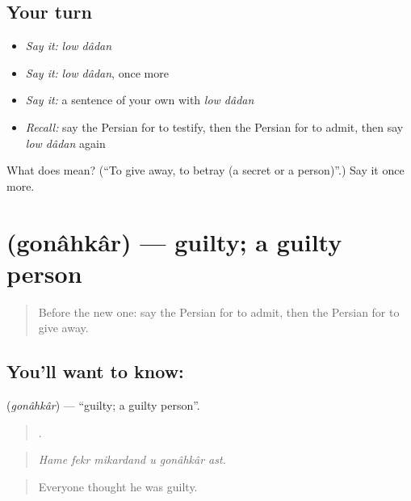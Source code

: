 \subsection*{Your turn}
\begin{itemize}
\raggedright
  \item \emph{Say it:} \emph{low dâdan}
  \item \emph{Say it:} \emph{low dâdan}, once more
  \item \emph{Say it:} a sentence of your own with \emph{low dâdan}
  \item \emph{Recall:} say the Persian for to testify, then the Persian for to admit, then say \emph{low dâdan} again
\end{itemize}

\begin{tcolorbox}[breakable,colback=teal!4,colframe=teal!35!black,title={Before you move on}]
What does   mean? (\textquotedblleft{}To give away, to betray (a secret or a person)\textquotedblright{}.) Say it once more.
\end{tcolorbox}
\section[\texorpdfstring{\fa{گناهکار} (gonâhkâr)}{گناهکار (gonâhkâr)}]{ (gonâhkâr) — guilty; a guilty person}

\label{lesson:FA-C321-gonahkar}



\begin{quote}
Before the new one: say the Persian for to admit, then the Persian for to give away.
\end{quote}

\subsection*{You'll want to know: }
\textbf{} (\emph{gonâhkâr}) — \textquotedblleft{}guilty; a guilty person\textquotedblright{}.

\begin{quote}
     .
\end{quote}

\begin{quote}
\emph{Hame fekr mikardand u gonâhkâr ast.}
\end{quote}

\begin{quote}
Everyone thought he was guilty.
\end{quote}

